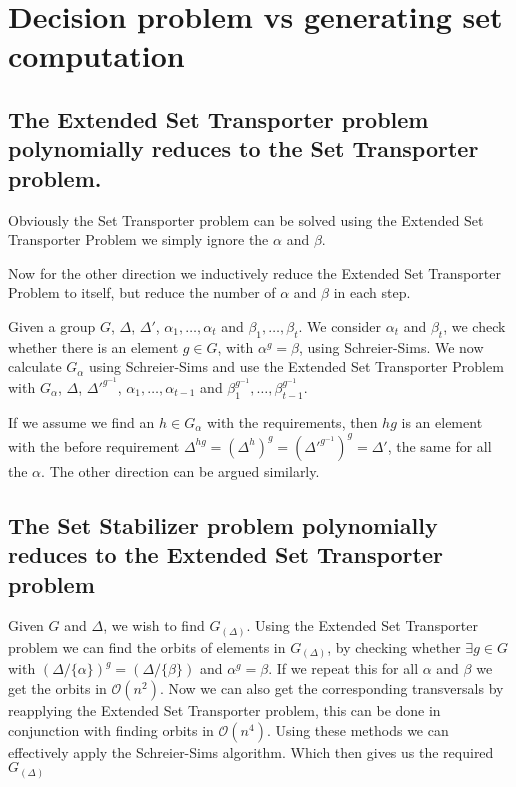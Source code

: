 \section{Decision problem vs generating set computation}

\subsection{The Extended Set Transporter problem polynomially reduces to the Set Transporter problem.}

Obviously the Set Transporter problem can be solved using the Extended Set Transporter Problem we simply ignore the $\alpha$ and $\beta$.

Now for the other direction we inductively reduce the Extended Set Transporter Problem to itself, but reduce the number of $\alpha$ and $\beta$ in each step.

Given a group $G$, $\Delta$, $\Delta'$, $\alpha_1,\dots,\alpha_t$ and $\beta_1, \dots, \beta_t$. We consider $\alpha_t$ and $\beta_t$, we check whether there is an element $g \in G$, with $\alpha^g=\beta$, using Schreier-Sims. We now calculate $G_{\alpha}$ using Schreier-Sims and use the Extended Set Transporter Problem with $G_{\alpha}$, $\Delta$, $\Delta'^{g^{-1}}$, $\alpha_1,\dots,\alpha_{t-1}$ and $\beta_1^{g^{-1}}, \dots, \beta_{t-1}^{g^{-1}}$.

If we assume we find an $h \in G_{\alpha}$ with the requirements, then $hg$ is an element with the before requirement $\Delta^{hg}=(\Delta^h)^g=(\Delta'^{g^{-1}})^g=\Delta'$, the same for all the $\alpha$. The other direction can be argued similarly.

\subsection{The Set Stabilizer problem polynomially reduces to the Extended Set Transporter problem}

Given $G$ and $\Delta$, we wish to find $G_{(\Delta)}$. Using the Extended Set Transporter problem we can find the orbits of elements in $G_{(\Delta)}$, by checking whether $\exists g \in G$ with $(\Delta/\{\alpha\})^g=(\Delta/\{\beta\})$ and $\alpha^g=\beta$. If we repeat this for all $\alpha$ and $\beta$ we get the orbits in $\mathcal{O}(n^2)$. Now we can also get the corresponding transversals by reapplying the Extended Set Transporter problem, this can be done in conjunction with finding orbits in $\mathcal{O}(n^4)$. Using these methods we can effectively apply the Schreier-Sims algorithm. Which then gives us the required $G_{(\Delta)}$

